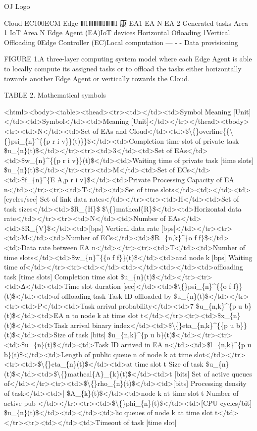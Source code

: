 \documentclass{article}
\begin{document}
OJ Logo

Cloud 
EC100ECM Edge Ⅲ1ⅢⅢⅢIⅢⅢI 
康
EA1
EA N EA 2
Generated tasks Area 1
IoT Area N Edge Agent (EA)IoT devices Horizontal Ofloading 
1Vertical Offloading 0Edge Controller (EC)Local computation — - -  Data provisioning

FIGURE 1.A three-layer computing system model where each Edge Agent is able to locally compute its assigned tasks or to offload the tasks either horizontally towards another Edge Agent or vertically towards the Cloud.

TABLE 2. Mathematical symbols

<html><body><table><thead><tr><td></td><td>Symbol Meaning [Unit]</td><td>Symbol</td><td>Meaning [Unit]</td></tr></thead><tbody><tr><td>N</td><td>Set of EAs and Cloud</td><td>\$\textbackslash\{\}overline\{\{\textbackslash\{\}psi\_\{n\}\textasciicircum{}\{\{p r i v\}\}(t)\}\}\$</td><td>Completion time slot of private task \$u\_\{n\}(t)\$</td></tr><tr><td>3</td><td>Set of EAs</td><td>\$w\_\{n\}\textasciicircum{}\{\{p r i v\}\}(t)\$</td><td>Waiting time of private task [time slots] \$u\_\{n\}(t)\$</td></tr><tr><td>M</td><td>Set of ECs</td><td>\$f\_\{n\}\textasciicircum{}\{E A,p r i v\}\$</td><td>Private Processing Capacity of EA n</td></tr><tr><td>T</td><td>Set of time slots</td><td></td><td>[cycles/sec] Set of link data rates</td></tr><tr><td>H</td><td>Set of task sizes</td><td>\$R\_\{H\}\$ \$\textbackslash\{\}mathcal\{R\}\$</td><td>Horizontal data rate</td></tr><tr><td>N</td><td>Number of EAs</td><td>\$R\_\{V\}\$</td><td>[bps] Vertical data rate [bps]</td></tr><tr><td>M</td><td>Number of ECs</td><td>\$R\_\{n,k\}\textasciicircum{}\{o f f\}\$</td><td>Data rate between EA n</td></tr><tr><td>T</td><td>Number of time slots</td><td>\$w\_\{n\}\textasciicircum{}\{\{o f f\}\}(t)\$</td><td>and node k [bps] Waiting time of</td></tr><tr><td></td><td></td><td></td><td>offloading task [time slots] Completion time slot \$u\_\{n\}(t)\$</td></tr><tr><td>∆</td><td>Time slot duration [sec]</td><td>\$\textbackslash\{\}psi\_\{n\}\textasciicircum{}\{\{o f f\}\}(t)\$</td><td>of offloading task Task ID offloaded by \$u\_\{n\}(t)\$</td></tr><tr><td>P</td><td>Task arrival probability</td><td>7 \$u\_\{n,k\}\textasciicircum{}\{p u b\}(t)\$</td><td>EA n to node k at time slot t</td></tr><tr><td>\$x\_\{n\}(t)\$</td><td>Task arrival binary index</td><td>\$\textbackslash\{\}eta\_\{n,k\}\textasciicircum{}\{\{p u b\}\}(t)\$</td><td>Size of task [bits] \$u\_\{n,k\}\textasciicircum{}\{p u b\}(t)\$</td></tr><tr><td>\$u\_\{n\}(t)\$</td><td>Task ID arrived in EA n</td><td>\$l\_\{n,k\}\textasciicircum{}\{p u b\}(t)\$</td><td>Length of public queue n of node k at time slot</td></tr><tr><td>\$\textbackslash\{\}eta\_\{n\}(t)\$</td><td>at time slot t Size of task \$u\_\{n\}(t)\$</td><td>\$\textbackslash\{\}mathcal\{A\}\_\{k\}(t)\$</td><td>t [bits] Set of active queues of</td></tr><tr><td>\$\textbackslash\{\}rho\_\{n\}(t)\$</td><td>[bits] Processing density of task</td><td>| \$A\_\{k\}(t)\$</td><td>node k at time slot t Number of active pub-</td></tr><tr><td>\$\textbackslash\{\}phi\_\{n\}(t)\$</td><td>[CPU cycles/bit] \$u\_\{n\}(t)\$</td><td></td><td>lic queues of node k at time slot t</td></tr><tr><td></td><td>Timeout of task [time slot] 
\end{document}
